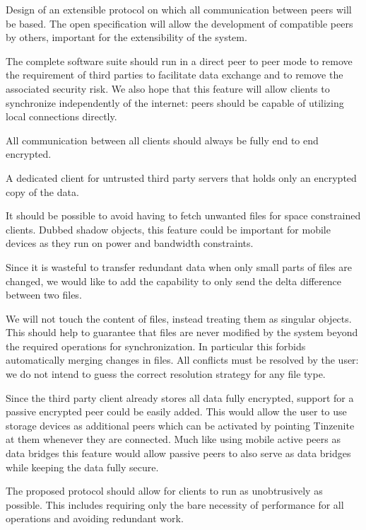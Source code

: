 \begin{description}[leftmargin=2em,style=nextline,noitemsep,nolistsep]
\item[File Synchronization Protocol]
    Design of an extensible protocol on which all communication between peers will be based.
    The open specification will allow the development of compatible peers by others, important for the extensibility of the system.
\item[Peer to Peer Architecture]
    The complete software suite should run in a direct peer to peer mode to remove the requirement of third parties to facilitate data exchange and to remove the associated security risk.
    We also hope that this feature will allow clients to synchronize independently of the internet: peers should be capable of utilizing local connections directly.
\item[Secure Transport]
    All communication between all clients should always be fully end to end encrypted.
\item[Third Party Client]
    A dedicated client for untrusted third party servers that holds only an encrypted copy of the data.
\item[Shadow Files]
    It should be possible to avoid having to fetch unwanted files for space constrained clients.
    Dubbed shadow objects, this feature could be important for mobile devices as they run on power and bandwidth constraints.
\item[Delta Updates]
    Since it is wasteful to transfer redundant data when only small parts of files are changed, we would like to add the capability to only send the delta difference between two files.
\item[Object Atomicity]
    We will not touch the content of files, instead treating them as singular objects.
    This should help to guarantee that files are never modified by the system beyond the required operations for synchronization.
    In particular this forbids automatically merging changes in files.
    All conflicts must be resolved by the user: we do not intend to guess the correct resolution strategy for any file type.
\item[Passive Peer]
    Since the third party client already stores all data fully encrypted, support for a passive encrypted peer could be easily added.
    This would allow the user to use storage devices as additional peers which can be activated by pointing Tinzenite at them whenever they are connected.
    Much like using mobile active peers as data bridges this feature would allow passive peers to also serve as data bridges while keeping the data fully secure.
\item[Performance]
    The proposed protocol should allow for clients to run as unobtrusively as possible.
    This includes requiring only the bare necessity of performance for all operations and avoiding redundant work.
\end{description}

